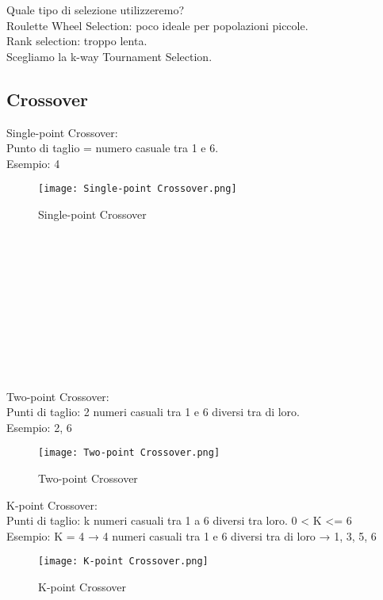 \documentclass[10pt,a4paper]{article}
\begin{document}
    Quale tipo di selezione utilizzeremo?\\
    Roulette Wheel Selection: poco ideale per popolazioni piccole.\\
    Rank selection: troppo lenta.\\
    Scegliamo la k-way Tournament Selection.\\
    
    \subsection{Crossover}
    \label{Crossover}
    Single-point Crossover:\\
    Punto di taglio  = numero casuale tra 1 e 6.\\
    Esempio: 4
    \begin{figure}[h!]
      \centering
      \caption{Single-point Crossover}
      \texttt{[image: Single-point Crossover.png]}
      \label{Single-pointCrossover}
    \end{figure}\\\\\\\\\\\\\\\\\\\\
    
    
    Two-point Crossover:\\
    Punti di taglio: 2 numeri casuali tra 1 e 6 diversi tra di loro.\\
    Esempio: 2, 6
    \begin{figure}[h!]
      \centering
      \caption{Two-point Crossover}
      \texttt{[image: Two-point Crossover.png]}
      \label{Two-pointCrossover}
    \end{figure}
    
    K-point Crossover:\\
    Punti di taglio: k numeri casuali tra 1 a 6 diversi tra loro. 0 < K <= 6\\
    Esempio: K = 4 → 4 numeri casuali tra 1 e 6 diversi tra di loro → 1, 3, 5, 6
    \begin{figure}[h!]
      \centering
      \caption{K-point Crossover}
      \texttt{[image: K-point Crossover.png]}
      \label{K-pointCrossover}
    \end{figure}
    
\end{document}
